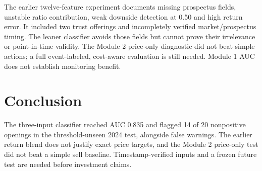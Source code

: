 \documentclass[runningheads]{llncs}
\begin{document}
The earlier twelve-feature experiment documents missing prospectus fields, unstable ratio contribution, weak downside detection at 0.50 and high return error. It included two trust offerings and incompletely verified market/prospectus timing. The leaner classifier avoids those fields but cannot prove their irrelevance or point-in-time validity. The Module 2 price-only diagnostic did not beat simple actions; a full event-labeled, cost-aware evaluation is still needed. Module 1 AUC does not establish monitoring benefit.

\newpage
\section{Conclusion}
The three-input classifier reached AUC 0.835 and flagged 14 of 20 nonpositive openings in the threshold-unseen 2024 test, alongside false warnings. The earlier return blend does not justify exact price targets, and the Module 2 price-only test did not beat a simple sell baseline. Timestamp-verified inputs and a frozen future test are needed before investment claims.
\end{document}
